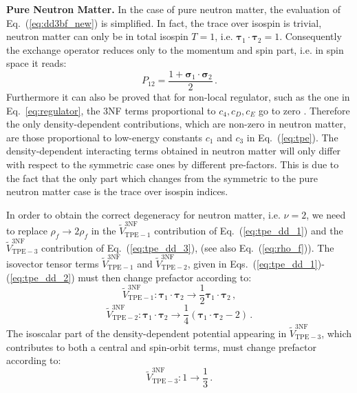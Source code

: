 {\bf Pure Neutron Matter.} In the case of pure neutron matter, the evaluation of Eq.~(\ref{eq:dd3bf_new}) is simplified. In fact,
the trace over isospin is trivial, neutron matter can only be in total isospin $T=1$, i.e. $\boldsymbol\tau_1\cdot\boldsymbol\tau_2=1$. Consequently the exchange operator reduces only to the momentum and spin part, i.e. in spin space it reads:
\begin{equation}
P_{12}=\frac{1+\boldsymbol\sigma_1\cdot\boldsymbol\sigma_2}{2}\,.
\label{eq:perm_op_2}
\end{equation}
Furthermore it can also be proved that for non-local regulator, such as the one in Eq.~\eqref{eq:regulator}, the 3NF terms proportional to $c_4, c_D, c_E$ go to zero \cite{ch11_Tolos2008,ch11_Hebeler2010Jul}. Therefore the only density-dependent contributions, which are non-zero in neutron matter, are those proportional to low-energy constants $c_1$ and $c_3$ in Eq.~(\ref{eq:tpe}). The density-dependent interacting terms obtained in neutron matter will only differ with respect to the symmetric case ones by different pre-factors. This is due to the fact that the only part which changes from the symmetric to the pure neutron matter case is the trace over isospin indices. 

In order to obtain the correct degeneracy for neutron matter, i.e.  $\nu=2$, we need to replace $\rho_f \rightarrow 2\rho_f$ in the $\widetilde V_\mathrm{TPE-1}^\mathrm{3NF}$ contribution of Eq.~(\ref{eq:tpe_dd_1}) and the $\widetilde V_\mathrm{TPE-3}^\mathrm{3NF}$ contribution of Eq.~(\ref{eq:tpe_dd_3}), (see also Eq.~(\ref{eq:rho_f})). The isovector tensor terms $\widetilde V_\mathrm{TPE-1}^\mathrm{3NF}$ and  $\widetilde V_\mathrm{TPE-2}^\mathrm{3NF}$, given in Eqs.~(\ref{eq:tpe_dd_1})-(\ref{eq:tpe_dd_2}) must then change prefactor according to:
\begin{equation}
\widetilde V_\mathrm{TPE-1}^\mathrm{3NF}: \boldsymbol\tau_1\cdot\boldsymbol\tau_2 \rightarrow \frac{1}{2}\boldsymbol\tau_1\cdot\boldsymbol\tau_2\,, 
\label{eq:pnm_tpe_1}
\end{equation}
\begin{equation}
\widetilde V_\mathrm{TPE-2}^\mathrm{3NF}: \boldsymbol\tau_1\cdot\boldsymbol\tau_2 \rightarrow 
\frac{1}{4}(\boldsymbol\tau_1\cdot\boldsymbol\tau_2-2)\,.
\label{eq:pnm_tpe_2}
\end{equation}
The isoscalar part of the density-dependent potential appearing in $\widetilde V_\mathrm{TPE-3}^\mathrm{3NF}$, which contributes to both a central and spin-orbit terms, must change prefactor according to:
\begin{equation}
\widetilde V_\mathrm{TPE-3}^\mathrm{3NF}: 1 \rightarrow \frac{1}{3}\,.
\label{eq:pnm_tpe_3}
\end{equation}
















